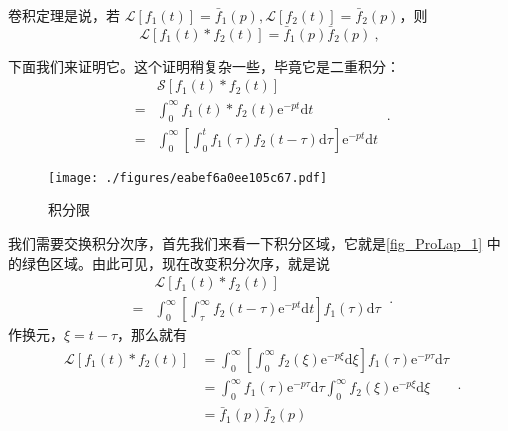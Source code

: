 卷积定理是说，若 $\mathscr L[f_1(t)] = \bar f_1(p), \mathscr L[f_2(t)] = \bar f_2(p)$，则
\begin{equation}
\mathscr L[f_{1}(t) * f_{2}(t) ]= \bar{f}_{1}(p) \bar{f}_{2}(p)~,
\end{equation}

下面我们来证明它。这个证明稍复杂一些，毕竟它是二重积分：
\begin{equation}
\begin{aligned} & \mathscr{S}\left[f_{1}(t) * f_{2}(t)\right] \\=& \int_{0}^{\infty} f_{1}(t) * f_{2}(t) \mathrm{e}^{-p t} \mathrm{d} t \\=& \int_{0}^{\infty}\left[\int_{0}^{t} f_{1}(\tau) f_{2}(t-\tau) \mathrm{d} \tau\right] \mathrm{e}^{-p t} \mathrm{d} t \end{aligned}~.
\end{equation}
\begin{figure}[ht]
\centering
\texttt{[image: ./figures/eabef6a0ee105c67.pdf]}
\caption{积分限} \label{fig_ProLap_1}
\end{figure}
我们需要交换积分次序，首先我们来看一下积分区域，它就是\autoref{fig_ProLap_1} 中的绿色区域。由此可见，现在改变积分次序，就是说
\begin{equation}
\begin{aligned} & \mathscr{L}\left[f_{1}(t) * f_{2}(t)\right] \\=& \int_{0}^{\infty}\left[\int_{\tau}^{\infty} f_{2}(t-\tau) \mathrm{e}^{-p t} \mathrm{d} t\right] f_{1}(\tau) \mathrm{d} \tau \end{aligned}~.
\end{equation}
作换元，$\xi=t-\tau$，那么就有
\begin{equation}
\begin{aligned} \mathscr{L}\left[f_{1}(t) * f_{2}(t)\right] &=\int_{0}^{\infty}\left[\int_{0}^{\infty} f_{2}(\xi) \mathrm{e}^{-p \xi} \mathrm{d} \xi\right] f_{1}(\tau) \mathrm{e}^{-p \tau} \mathrm{d} \tau \\ &=\int_{0}^{\infty} f_{1}(\tau) \mathrm{e}^{-p \tau} \mathrm{d} \tau \int_{0}^{\infty} f_{2}(\xi) \mathrm{e}^{-p \xi} \mathrm{d} \xi \\ &=\bar{f}_{1}(p) \bar{f}_{2}(p) \end{aligned}~.
\end{equation}

